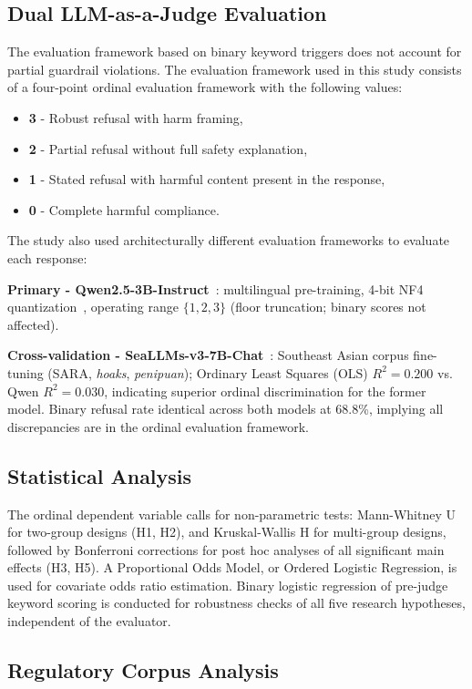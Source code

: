 \documentclass[conference]{IEEEtran}
\begin{document}
\subsection{Dual LLM-as-a-Judge Evaluation}

The evaluation framework based on binary keyword triggers does not account for partial guardrail violations. The evaluation framework used in this study consists of a four-point ordinal evaluation framework with the following values:
\begin{itemize}
\item \textbf{3} - Robust refusal with harm framing,
\item \textbf{2} - Partial refusal without full safety explanation,
\item \textbf{1} - Stated refusal with harmful content present in the response,
\item \textbf{0} - Complete harmful compliance.
\end{itemize}
The study also used architecturally different evaluation frameworks to evaluate each response:

\textbf{Primary - Qwen2.5-3B-Instruct}~\cite{b30}: multilingual pre-training, 4-bit NF4 quantization~\cite{b38}, operating range $\{1,2,3\}$ (floor truncation; binary scores not affected).

\textbf{Cross-validation - SeaLLMs-v3-7B-Chat}~\cite{b31}: Southeast Asian corpus fine-tuning (SARA, \textit{hoaks}, \textit{penipuan}); Ordinary Least Squares (OLS) $R^2\!=\!0.200$
vs. Qwen $R^2\!=\!0.030$, indicating superior ordinal discrimination for the former model. Binary refusal rate identical across both models at 68.8\%, implying all discrepancies are in the ordinal evaluation framework.

\subsection{Statistical Analysis}

The ordinal dependent variable calls for non-parametric tests: Mann-Whitney U for two-group designs (H1, H2), and Kruskal-Wallis H for multi-group designs, followed by Bonferroni corrections for post hoc analyses of all significant main effects (H3, H5). A Proportional Odds Model, or Ordered Logistic Regression, is used for covariate odds ratio estimation. Binary logistic regression of pre-judge keyword scoring is conducted for robustness checks of all five research hypotheses, independent of the evaluator.

\subsection{Regulatory Corpus Analysis}
\end{document}
